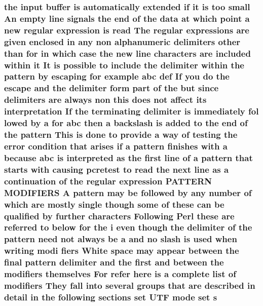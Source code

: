 \subsubsection[{\texorpdfstring{s}{s}}]{\setlength{\rightskip}{0pt plus 5cm}the {\bf input} {\bf buffer} {\bf is} automatically extended {\bf if} {\bf it} {\bf is} too small An {\bf empty} {\bf line} signals the {\bf end} {\bf of} the {\bf data} at {\bf which} {\bf point} {\bf a} new regular {\bf expression} {\bf is} {\bf read} The regular {\bf expressions} {\bf are} {\bf given} enclosed {\bf in} {\bf any} non {\bf alphanumeric} delimiters other {\bf than} for {\bf in} {\bf which} {\bf case} the new {\bf line} {\bf characters} {\bf are} {\bf included} within {\bf it} It {\bf is} {\bf possible} {\bf to} {\bf include} the delimiter within the {\bf pattern} by escaping for {\bf example} {\bf abc} def If you {\bf do} the escape and the delimiter form part {\bf of} the but since delimiters {\bf are} always non {\bf this} does {\bf not} affect its interpretation If the terminating delimiter {\bf is} immediately fol lowed by {\bf a} for {\bf abc} then {\bf a} {\bf backslash} {\bf is} added {\bf to} the {\bf end} {\bf of} the {\bf pattern} This {\bf is} {\bf done} {\bf to} provide {\bf a} {\bf way} {\bf of} testing the {\bf error} condition that {\bf arises} {\bf if} {\bf a} {\bf pattern} finishes {\bf with} {\bf a} because {\bf abc} {\bf is} interpreted {\bf as} the {\bf first} {\bf line} {\bf of} {\bf a} {\bf pattern} that starts {\bf with} causing {\bf pcretest} {\bf to} {\bf read} the next {\bf line} {\bf as} {\bf a} continuation {\bf of} the regular {\bf expression} P\+A\+T\+T\+E\+RN M\+O\+D\+I\+F\+I\+E\+RS {\bf A} {\bf pattern} may {\bf be} followed by {\bf any} {\bf number} {\bf of} {\bf which} {\bf are} mostly single {\bf though} some {\bf of} these {\bf can} {\bf be} qualified by further {\bf characters} Following {\bf Perl} these {\bf are} referred {\bf to} {\bf below} for the {\bf i} even {\bf though} the delimiter {\bf of} the {\bf pattern} need {\bf not} always {\bf be} {\bf a} and no {\bf slash} {\bf is} {\bf used} when writing modi fiers White {\bf space} may appear between the final {\bf pattern} delimiter and the {\bf first} and between the {\bf modifiers} {\bf themselves} For refer {\bf here} {\bf is} {\bf a} complete {\bf list} {\bf of} {\bf modifiers} They fall into several groups that {\bf are} described {\bf in} detail {\bf in} the following sections {\bf set} U\+TF {\bf mode} {\bf set} s}\hypertarget{pcretest_8txt_a062597889ba244b72877454b1d3adecf}{}\label{pcretest_8txt_a062597889ba244b72877454b1d3adecf}
